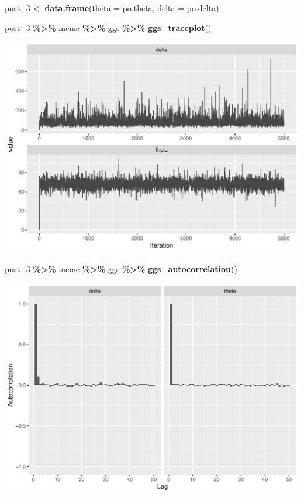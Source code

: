 \documentclass[
]{article}
\newenvironment{Shaded}{\begin{snugshade}}{\end{snugshade}}
\newcommand{\AttributeTok}[1]{\textcolor[rgb]{0.13,0.29,0.53}{#1}}
\newcommand{\FunctionTok}[1]{\textcolor[rgb]{0.13,0.29,0.53}{\textbf{#1}}}
\newcommand{\NormalTok}[1]{#1}
\newcommand{\OtherTok}[1]{\textcolor[rgb]{0.56,0.35,0.01}{#1}}
\newcommand{\SpecialCharTok}[1]{\textcolor[rgb]{0.81,0.36,0.00}{\textbf{#1}}}
\begin{document}
\begin{Shaded}
\begin{Highlighting}[]
\NormalTok{post\_3 }\OtherTok{\textless{}{-}} \FunctionTok{data.frame}\NormalTok{(}\AttributeTok{theta =}\NormalTok{ po.theta, }\AttributeTok{delta =}\NormalTok{ po.delta)}
\end{Highlighting}
\end{Shaded}

\begin{Shaded}
\begin{Highlighting}[]
\NormalTok{post\_3 }\SpecialCharTok{\%\textgreater{}\%}\NormalTok{ mcmc }\SpecialCharTok{\%\textgreater{}\%}\NormalTok{ ggs }\SpecialCharTok{\%\textgreater{}\%} \FunctionTok{ggs\_traceplot}\NormalTok{()}
\end{Highlighting}
\end{Shaded}

\begin{center}\includegraphics[width=0.8\linewidth]{Bayes_stat_hw3_files/figure-latex/unnamed-chunk-46-1} \end{center}

\begin{Shaded}
\begin{Highlighting}[]
\NormalTok{post\_3 }\SpecialCharTok{\%\textgreater{}\%}\NormalTok{ mcmc }\SpecialCharTok{\%\textgreater{}\%}\NormalTok{ ggs }\SpecialCharTok{\%\textgreater{}\%} \FunctionTok{ggs\_autocorrelation}\NormalTok{()}
\end{Highlighting}
\end{Shaded}

\begin{center}\includegraphics[width=0.8\linewidth]{Bayes_stat_hw3_files/figure-latex/unnamed-chunk-46-2} \end{center}
\end{document}

